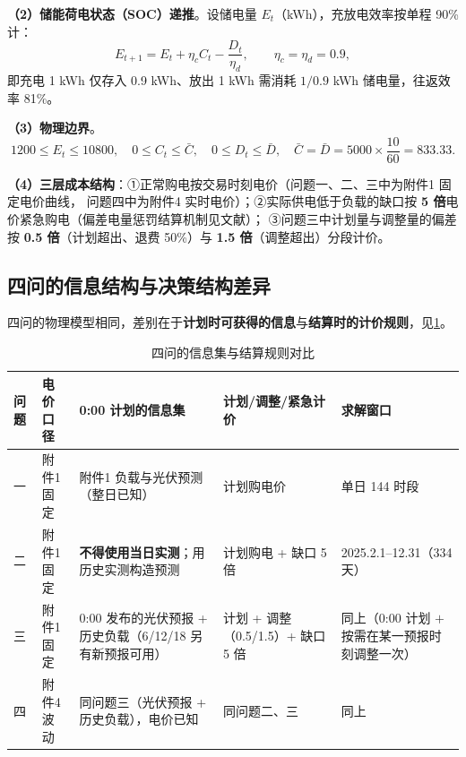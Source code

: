 \documentclass[12pt,a4paper,fontset=fandol]{ctexart}
\begin{document}
\textbf{（2\nobreak）储能荷电状态（SOC\nobreak）递推}\nobreak。设储电量 $E_t$（kWh\nobreak）\nobreak，充放电效率按单程 90\% 计\nobreak：
\begin{equation}
E_{t+1} = E_t + \eta_c C_t - \frac{D_t}{\eta_d}, \qquad \eta_c=\eta_d=0.9 ,
\label{eq:soc}
\end{equation}
即充电 1 kWh 仅存入 0.9 kWh\nobreak、放出 1 kWh 需消耗 $1/0.9$ kWh 储电量\nobreak，往返效率 81\%\nobreak。

\textbf{（3\nobreak）物理边界}\nobreak。
\begin{equation}
1200 \le E_t \le 10800,\quad 0\le C_t \le \bar C,\quad 0\le D_t \le \bar D,\quad \bar C=\bar D=5000\times\frac{10}{60}=833.33 .
\label{eq:bounds}
\end{equation}

\textbf{（4\nobreak）三层成本结构}\nobreak：①正常购电按交易时刻电价（问题一\nobreak、二\nobreak、三中为附件1 固定电价曲线\nobreak，
问题四中为附件4 实时电价\nobreak）\nobreak；②实际供电低于负载的缺口按 \textbf{5 倍}电价紧急购电（偏差电量惩罚结算机制见文献\cite{cn111260354}\nobreak）\nobreak；
③问题三中计划量与调整量的偏差按 \textbf{0.5 倍}（计划超出\nobreak、退费 50\%\nobreak）与
\textbf{1.5 倍}（调整超出\nobreak）分段计价\nobreak。

\subsection{四问的信息结构与决策结构差异}

四问的物理模型相同\nobreak，差别在于\textbf{计划时可获得的信息}与\textbf{结算时的计价规则}\nobreak，见\cref{tab:info}\nobreak。

\begin{table}[htbp]
\centering
\caption{四问的信息集与结算规则对比}
\label{tab:info}
\begin{tabularx}{\textwidth}{@{}p{1.2cm}p{2.5cm}p{3.3cm}p{3.6cm}X@{}}
\toprule
问题 & 电价口径 & 0:00 计划的信息集 & 计划/调整/紧急计价 & 求解窗口 \\
\midrule
一 & 附件1 固定 & 附件1 负载与光伏预测（整日已知\nobreak） & 计划购电价 & 单日 144 时段 \\
二 & 附件1 固定 & \textbf{不得使用当日实测}\nobreak；用历史实测构造预测 & 计划购电 + 缺口 5 倍 & 2025.2.1--12.31（334 天\nobreak） \\
三 & 附件1 固定 & 0:00 发布的光伏预报 + 历史负载（6/12/18 另有新预报可用\nobreak） & 计划 + 调整（0.5/1.5\nobreak）+ 缺口 5 倍 & 同上（0:00 计划 $+$ 按需在某一预报时刻调整一次\nobreak） \\
四 & 附件4 波动 & 同问题三（光伏预报 + 历史负载\nobreak）\nobreak，电价已知 & 同问题二\nobreak、三 & 同上 \\
\bottomrule
\end{tabularx}
\end{table}
\end{document}
